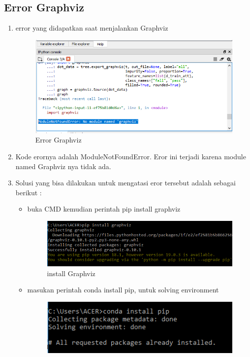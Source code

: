 \subsection{Error Graphviz}
\begin{enumerate}
	\item
error yang didapatkan saat menjalankan Graphviz
\begin{figure}[ht]
\centering
\includegraphics[scale=0.5]{figures/spyder/20.png}
\caption{Error Graphviz}
\label{Error}
\end{figure}
	\item
Kode erornya adalah ModuleNotFoundError. Eror ini terjadi karena module named Graphviz nya tidak ada.
	\item
Solusi yang bisa dilakukan untuk mengatasi eror tersebut adalah sebagai berikut : \\
\begin{itemize}
\item
buka CMD kemudian perintah pip install graphviz
\begin{figure}[ht]
\centering
\includegraphics[scale=0.5]{figures/spyder/21.png}
\caption{install Graphviz}
\label{solusi}
\end{figure}
\item
masukan perintah conda install pip, untuk solving environment
\begin{figure}[ht]
\centering
\includegraphics[scale=0.5]{figures/spyder/22.png}

\end{figure}
\end{itemize}
\end{enumerate}
